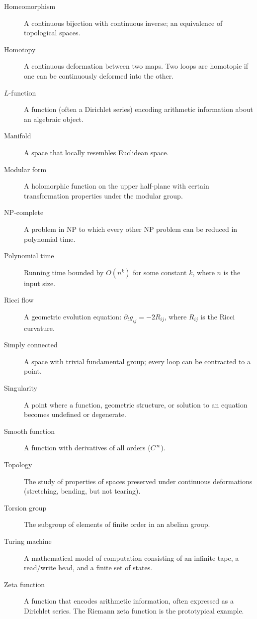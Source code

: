 \begin{description}
  \item[Homeomorphism] A continuous bijection with continuous inverse; an equivalence of topological spaces.
  \item[Homotopy] A continuous deformation between two maps. Two loops are homotopic if one can be continuously deformed into the other.
  \item[$L$-function] A function (often a Dirichlet series) encoding arithmetic information about an algebraic object.
  \item[Manifold] A space that locally resembles Euclidean space.
  \item[Modular form] A holomorphic function on the upper half-plane with certain transformation properties under the modular group.
  \item[NP-complete] A problem in NP to which every other NP problem can be reduced in polynomial time.
  \item[Polynomial time] Running time bounded by $O(n^k)$ for some constant $k$, where $n$ is the input size.
  \item[Ricci flow] A geometric evolution equation: $\partial_t g_{ij} = -2 R_{ij}$, where $R_{ij}$ is the Ricci curvature.
  \item[Simply connected] A space with trivial fundamental group; every loop can be contracted to a point.
  \item[Singularity] A point where a function, geometric structure, or solution to an equation becomes undefined or degenerate.
  \item[Smooth function] A function with derivatives of all orders ($C^\infty$).
  \item[Topology] The study of properties of spaces preserved under continuous deformations (stretching, bending, but not tearing).
  \item[Torsion group] The subgroup of elements of finite order in an abelian group.
  \item[Turing machine] A mathematical model of computation consisting of an infinite tape, a read/write head, and a finite set of states.
  \item[Zeta function] A function that encodes arithmetic information, often expressed as a Dirichlet series. The Riemann zeta function is the prototypical example.
\end{description}
